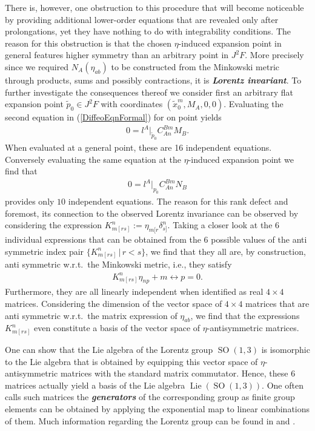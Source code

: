 There is, however, one obstruction to this procedure that will become noticeable by providing additional lower-order equations that are revealed only after prolongations, yet they have nothing to do with integrability conditions. 
The reason for this obstruction is that the chosen $\eta$-induced expansion point in general features higher symmetry than an arbitrary point in $J^2F$. More precisely since we required $N_A(\eta_{ab})$ to be constructed from the Minkowski metric through products, sums and possibly contractions, it is \textit{\textbf{Lorentz invariant}}. To further investigate the consequences thereof we consider first an arbitrary flat expansion point $\tilde{p}_0 \in J^2F$ with coordinates $(\tilde{x}_0^m,M_A,0,0)$. Evaluating the second equation in (\ref{DiffeoEqnFormal}) for on point yields
\begin{align}
    0 = l^A \big \vert _{\tilde{p}_0} C^{Bm}_{An}M_B.
\end{align}
When evaluated at a general point, these are 16 independent equations. 
Conversely evaluating the same equation at the $\eta$-induced expansion point we find that
\begin{align}\label{RankDef}
    0 = l^A \big \vert_{p_0} C^{Bm}_{An}N_B
\end{align}
provides only $10$ independent equations. The reason for this rank defect and foremost, its connection to the observed Lorentz invariance can be observed by considering the expression $K_{m[rs]}^n :=\eta_{m[r}\delta_{s]}^n$. 
Taking a closer look at the $6$ individual expressions that can be obtained from the $6$ possible values of the anti symmetric index pair  $\{K_{m[rs]}^n \, \big \vert \, r < s \}$, we find that they all are, by construction, anti symmetric w.r.t.\ the Minkowski metric, i.e., they satisfy 
\begin{align}
K_{m[rs]}^n\eta_{n p} + m \leftrightarrow p = 0.
\end{align}
Furthermore, they are all linearly independent when identified as real $4 \times 4$ matrices. Considering the dimension of the vector space of $4 \times 4$ matrices that are anti symmetric w.r.t.\ the matrix expression of $\eta_{ab}$, we find that  the expressions $K_{m[rs]}^n$ even constitute a basis of the vector space of $\eta$-antisymmetric matrices. 

One can show that the Lie algebra of the Lorentz group $\operatorname{SO}(1,3)$ is isomorphic to the Lie algebra that is obtained by equipping this vector space of $\eta$-antisymmetric matrices with the standard matrix commutator. Hence, these $6$ matrices actually yield a basis of the Lie algebra $\operatorname{Lie}(\operatorname{SO}(1,3))$. One often calls such matrices the \textit{\textbf{generators}} of the corresponding group as finite group elements can be obtained by applying the exponential map to linear combinations of them. Much information regarding the Lorentz group can be found in \cite{doi:10.1142/p199} and \cite{naimark2014linear}.

